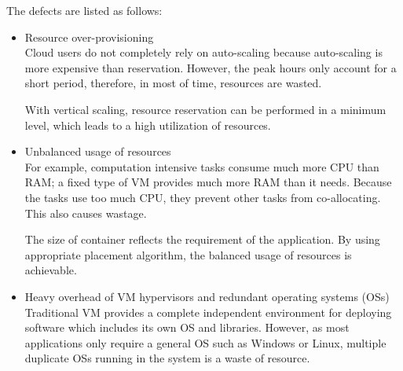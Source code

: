 
The defects are listed as follows:
\begin{itemize}
	\item Resource over-provisioning \\
	 Cloud users do not completely rely on auto-scaling because auto-scaling is more expensive than reservation. However, the peak hours only account for a short period, therefore, in most of time, resources are wasted.

	 With vertical scaling, resource reservation can be performed in a minimum level, which leads to a high utilization of resources.

	\item Unbalanced usage of resources \\
	For example, computation intensive tasks consume much more CPU than RAM; a fixed type of VM provides much more RAM than it needs. Because the tasks use too much CPU, they prevent other tasks from co-allocating. This also causes wastage.

	 The size of container reflects the requirement of the application. By using appropriate placement algorithm, the balanced usage of resources is achievable.

	\item Heavy overhead of VM hypervisors and redundant operating systems (OSs) \\
	 Traditional VM provides a complete independent environment for deploying software which includes its own OS and libraries. However, as most applications only require a general OS such as Windows or Linux, multiple duplicate OSs running in the system is a waste of resource.

\end{itemize}




